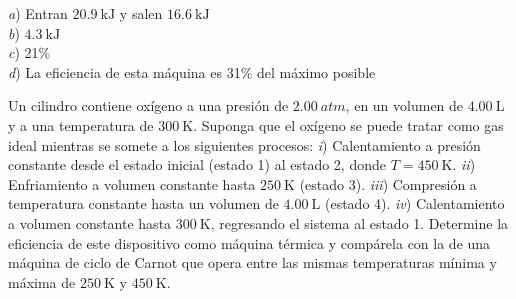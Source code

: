 \begin{Answer}
	\begin{minipage}[t]{.4\textwidth}
    \textit{a}) Entran $\SI{20.9}{\kilo\joule}$ y salen $\SI{16.6}{\kilo\joule}$\\ \textit{b}) $\SI{4.3}{\kilo\joule}$\\ \textit{c}) 21\%\\ \textit{d}) La eficiencia de esta máquina es 31\% del máximo posible
  \end{minipage}
\end{Answer}
%
\begin{center}
\end{center}
%
\begin{Exercise}
  Un cilindro contiene oxígeno a una presión de $\SI{2.00}{atm}$, en un volumen de $\SI{4.00}{\liter}$ y a una temperatura de $\SI{300}{\kelvin}$. Suponga que el oxígeno se puede tratar como gas ideal mientras se somete a los siguientes procesos: \textit{i}) Calentamiento a presión constante desde el estado inicial (estado 1) al estado 2, donde $T = \SI{450}{\kelvin}$. \textit{ii}) Enfriamiento a volumen constante hasta $\SI{250}{\kelvin}$ (estado 3). \textit{iii}) Compresión a temperatura constante hasta un volumen de $\SI{4.00}{\liter}$ (estado 4). \textit{iv}) Calentamiento a volumen constante hasta $\SI{300}{\kelvin}$, regresando el sistema al estado 1. Determine la eficiencia de este dispositivo como máquina térmica y compárela con la de una máquina de ciclo de Carnot que opera entre las mismas temperaturas mínima y máxima de $\SI{250}{\kelvin}$ y $\SI{450}{\kelvin}$.
\end{Exercise}
